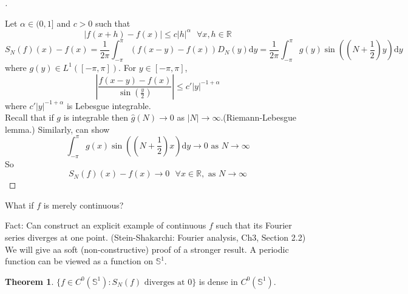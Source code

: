 \documentclass{article}
\theoremstyle{definition}
\newtheorem{thm}{Theorem}
\newenvironment{proofs}[1][\proofname]{%
  \begin{proof}[#1]$ $\par\nobreak\ignorespaces
}{%
  \end{proof}
}
\newcommand{\sfa}{\text{  } \forall}
\begin{document}
\begin{proofs}
	Let $\alpha \in (0, 1]$ and $c > 0$ such that
	\[
		|f(x + h) - f(x)| \leq c |h|^\alpha \sfa x, h \in \mathbb{R}
	\]
	\[
		S_N(f)(x) - f(x) = \frac{1}{2 \pi} \int_{- \pi}^\pi \left(f(x - y) - f(x)\right) D_N(y) \mathrm{d} y = \frac{1}{2 \pi} \int_{- \pi}^\pi g(y) \sin \left( \left(N + \frac{1}{2} \right) y \right) \mathrm{d} y
	\]
	where $g(y) \in L^1([-\pi, \pi])$.
	For $y \in [-\pi, \pi]$, 
	\[
		\left|\frac{f(x - y) - f(x)}{\sin \left( \frac{y}{2} \right) } \right| \leq c'|y|^{-1 + \alpha}
	\]
	where $c'|y|^{-1 + \alpha}$ is Lebesgue integrable.\\
	Recall that if $g$ is integrable then $\hat{g}(N) \to 0$ as $|N| \to \infty$.(Riemann-Lebesgue lemma.)
	Similarly, can show
	\[
		\int_{-\pi}^\pi g(x) \sin \left( \left( N + \frac{1}{2} \right) x \right) \mathrm{d} y \to 0 \text{ as } N \to \infty
	\]
	So 
	\[
		S_N(f)(x) - f(x) \to 0 \sfa x \in \mathbb{R}, \text{ as } N \to \infty
	\]
\end{proofs}

What if $f$ is merely continuous?
\par Fact: Can construct an explicit example of continuous $f$ such that its Fourier series diverges at one point.
(Stein-Shakarchi: Fourier analysis, Ch3, Section 2.2)
We will give aa soft (non-constructive) proof of a stronger result.
A periodic function can be viewed as a function on $\mathbb{S}^1$.

\begin{thm}
	$\{f \in C^0(\mathbb{S}^1): S_N(f) \text{ diverges at } 0 \}$ is dense in $C^0(\mathbb{S}^1)$.
\end{thm}
\end{document}

